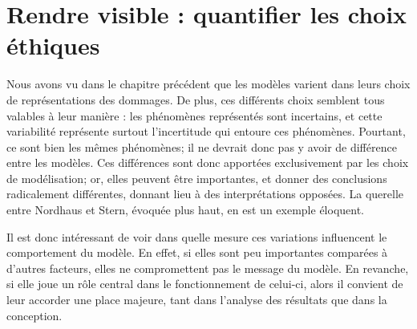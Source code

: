 \chapter{Rendre visible : quantifier les choix éthiques}
\label{chapter:modelisation}
\newrefsegment
{}





\newpage


Nous avons vu dans le chapitre précédent que les modèles varient dans leurs choix de représentations des dommages. De plus, ces différents choix semblent tous valables à leur manière : les phénomènes représentés sont incertains, et cette variabilité représente surtout l'incertitude qui entoure ces phénomènes. Pourtant, ce sont bien les mêmes phénomènes; il ne devrait donc pas y avoir de différence entre les modèles. Ces différences sont donc apportées exclusivement par les choix de modélisation; or, elles peuvent être importantes, et donner des conclusions radicalement différentes, donnant lieu à des interprétations opposées. La querelle entre Nordhaus et Stern, évoquée plus haut, en est un exemple éloquent. 

Il est donc intéressant de voir dans quelle mesure ces variations influencent le comportement du modèle. En effet, si elles sont peu importantes comparées à d'autres facteurs, elles ne compromettent pas le message du modèle. En revanche, si elle joue un rôle central dans le fonctionnement de celui-ci, alors il convient de leur accorder une place majeure, tant dans l'analyse des résultats que dans la conception. 

